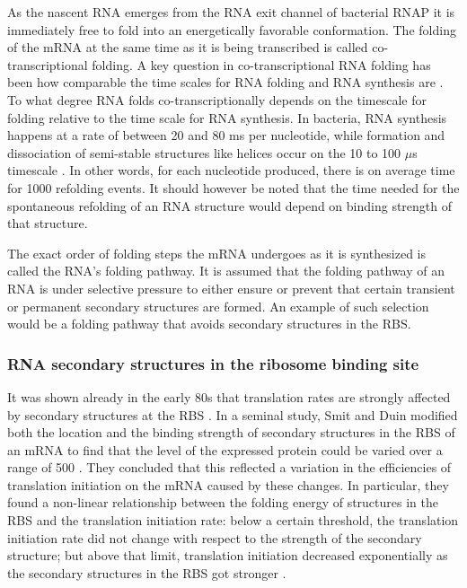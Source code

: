 As the nascent RNA emerges from the RNA exit channel of bacterial RNAP it is
immediately free to fold into an energetically favorable conformation. The
folding of the mRNA at the same time as it is being transcribed is called
co-transcriptional folding. A key question in co-transcriptional RNA folding
has been how comparable the time scales for RNA folding and RNA synthesis are
\cite{de_smit_translational_2003}. To what degree RNA folds
co-transcriptionally depends on the timescale for folding relative to the time
scale for RNA synthesis. In bacteria, RNA synthesis happens at a rate of
between 20 and 80 ms per nucleotide, while formation and dissociation of
semi-stable structures like helices occur on the 10 to 100 $\mu$s timescale
\cite{isambert_jerky_2009}. In other words, for each nucleotide produced, there
is on average time for 1000 refolding events. It should however be noted that
the time needed for the spontaneous refolding of an RNA structure would depend
on binding strength of that structure.

The exact order of folding steps the mRNA undergoes as it is synthesized is
called the RNA's folding pathway. It is assumed that the folding pathway of an
RNA is under selective pressure to either ensure or prevent that certain
transient or permanent secondary structures are formed\cite{pan_rna_2006}. An
example of such selection would be a folding pathway that avoids secondary
structures in the RBS.

\subsubsection{RNA secondary structures in the ribosome binding site}
It was shown already in the early 80s that translation rates are strongly
affected by secondary structures at the RBS \cite{hall_role_1982}. In a seminal
study, Smit and Duin modified both the location and the binding strength of
secondary structures in the RBS of an mRNA to find that the level of the
expressed protein could be varied over a range of 500
\cite{de_smit_secondary_1990}. They concluded that this reflected a variation
in the efficiencies of translation initiation on the mRNA caused by these
changes. In particular, they found a non-linear relationship between the
folding energy of structures in the RBS and the translation initiation rate:
below a certain threshold, the translation initiation rate did not change with
respect to the strength of the secondary structure; but above that limit,
translation initiation decreased exponentially as the secondary structures in
the RBS got stronger \cite{de_smit_secondary_1990}.

